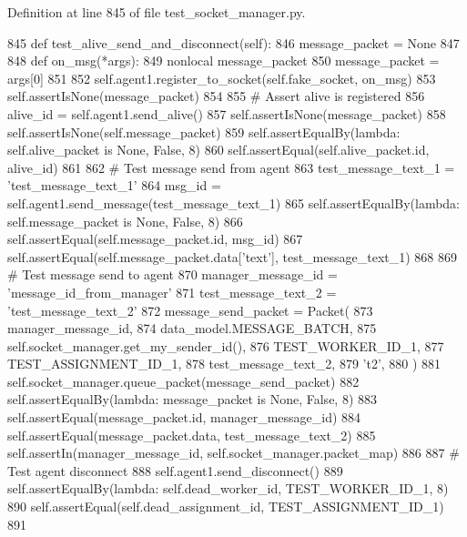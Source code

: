 Definition at line 845 of file test\+\_\+socket\+\_\+manager.\+py.


\begin{DoxyCode}
845     \textcolor{keyword}{def }test\_alive\_send\_and\_disconnect(self):
846         message\_packet = \textcolor{keywordtype}{None}
847 
848         \textcolor{keyword}{def }on\_msg(*args):
849             nonlocal message\_packet
850             message\_packet = args[0]
851 
852         self.agent1.register\_to\_socket(self.fake\_socket, on\_msg)
853         self.assertIsNone(message\_packet)
854 
855         \textcolor{comment}{# Assert alive is registered}
856         alive\_id = self.agent1.send\_alive()
857         self.assertIsNone(message\_packet)
858         self.assertIsNone(self.message\_packet)
859         self.assertEqualBy(\textcolor{keyword}{lambda}: self.alive\_packet \textcolor{keywordflow}{is} \textcolor{keywordtype}{None}, \textcolor{keyword}{False}, 8)
860         self.assertEqual(self.alive\_packet.id, alive\_id)
861 
862         \textcolor{comment}{# Test message send from agent}
863         test\_message\_text\_1 = \textcolor{stringliteral}{'test\_message\_text\_1'}
864         msg\_id = self.agent1.send\_message(test\_message\_text\_1)
865         self.assertEqualBy(\textcolor{keyword}{lambda}: self.message\_packet \textcolor{keywordflow}{is} \textcolor{keywordtype}{None}, \textcolor{keyword}{False}, 8)
866         self.assertEqual(self.message\_packet.id, msg\_id)
867         self.assertEqual(self.message\_packet.data[\textcolor{stringliteral}{'text'}], test\_message\_text\_1)
868 
869         \textcolor{comment}{# Test message send to agent}
870         manager\_message\_id = \textcolor{stringliteral}{'message\_id\_from\_manager'}
871         test\_message\_text\_2 = \textcolor{stringliteral}{'test\_message\_text\_2'}
872         message\_send\_packet = Packet(
873             manager\_message\_id,
874             data\_model.MESSAGE\_BATCH,
875             self.socket\_manager.get\_my\_sender\_id(),
876             TEST\_WORKER\_ID\_1,
877             TEST\_ASSIGNMENT\_ID\_1,
878             test\_message\_text\_2,
879             \textcolor{stringliteral}{'t2'},
880         )
881         self.socket\_manager.queue\_packet(message\_send\_packet)
882         self.assertEqualBy(\textcolor{keyword}{lambda}: message\_packet \textcolor{keywordflow}{is} \textcolor{keywordtype}{None}, \textcolor{keyword}{False}, 8)
883         self.assertEqual(message\_packet.id, manager\_message\_id)
884         self.assertEqual(message\_packet.data, test\_message\_text\_2)
885         self.assertIn(manager\_message\_id, self.socket\_manager.packet\_map)
886 
887         \textcolor{comment}{# Test agent disconnect}
888         self.agent1.send\_disconnect()
889         self.assertEqualBy(\textcolor{keyword}{lambda}: self.dead\_worker\_id, TEST\_WORKER\_ID\_1, 8)
890         self.assertEqual(self.dead\_assignment\_id, TEST\_ASSIGNMENT\_ID\_1)
891 
\end{DoxyCode}
